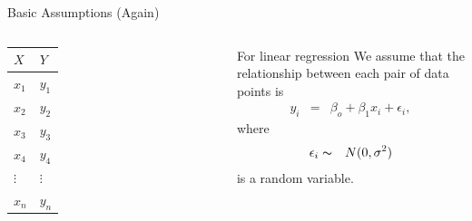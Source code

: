 \begin{frame}{Basic Assumptions (Again)}
  
  \begin{columns}

    \begin{tabular}{l|l}
      $X$ & $Y$ \\ \hline
      $x_1$ & $y_1$ \\
      $x_2$ & $y_2$ \\
      $x_3$ & $y_3$ \\
      $x_4$ & $y_4$ \\
      $\vdots$ & $\vdots$ \\
      $x_n$ & $y_n$ \\
    \end{tabular}


    \vfill


    For linear regression We assume that the relationship between each
    pair of data points is
    \begin{eqnarray*}
      y_i & = & \beta_o + \beta_1 x_i + \epsilon_i,
    \end{eqnarray*}
    where 
    \begin{eqnarray*}
      \epsilon_i & \thicksim & N(0,\sigma^2)
    \end{eqnarray*}
    is a random variable. 

    \vfill

  \end{columns}

\end{frame}



